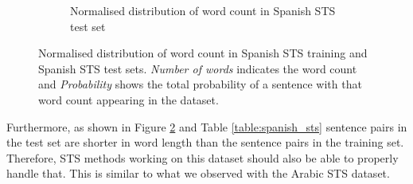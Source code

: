 \begin{enumerate}
\begin{figure}
\begin{subfigure}[b]{.5\textwidth}
		\caption{Normalised distribution of word count in Spanish STS test set}
		\label{fig:spanish_sts_test_words}
	\end{subfigure}
	\caption[Normalised distribution of word count in Spanish STS training and Spanish STS test sets.]{Normalised distribution of word count in Spanish STS training and Spanish STS test sets. \textit{Number of words} indicates the word count and \textit{Probability} shows the total probability of a sentence with that word count appearing in the dataset.}
	\label{fig:spanish_sts_words}
\end{figure}

Furthermore, as shown in Figure \ref{fig:spanish_sts_words} and Table \ref{table:spanish_sts} sentence pairs in the test set are shorter in word length than the sentence pairs in the training set. Therefore, STS methods working on this dataset should also be able to properly handle that. This is similar to what we observed with the Arabic STS dataset.





\end{enumerate}
